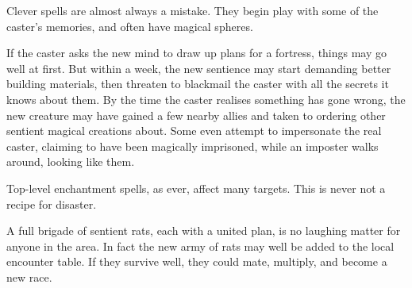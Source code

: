 \begin{multicols}{2}

Clever spells are almost always a mistake.
They begin play with some of the caster's memories, and often have magical spheres.

If the caster asks the new mind to draw up plans for a fortress, things may go well at first.
But within a week, the new sentience may start demanding better building materials, then threaten to blackmail the caster with all the secrets it knows about them.
By the time the caster realises something has gone wrong, the new creature may have gained a few nearby allies and taken to ordering other sentient magical creations about.
Some even attempt to impersonate the real caster, claiming to have been magically imprisoned, while an imposter walks around, looking like them.


Top-level enchantment spells, as ever, affect many targets.
This is never not a recipe for disaster.

A full brigade of sentient rats, each with a united plan, is no laughing matter for anyone in the area.
In fact the new army of rats may well be added to the local encounter table.
If they survive well, they could mate, multiply, and become a new race.


\end{multicols}
